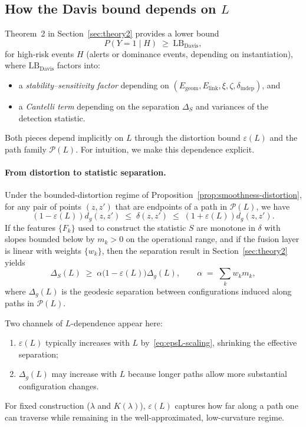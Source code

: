 \documentclass[11pt]{article}
\begin{document}
\subsection{How the Davis bound depends on $L$}
\label{subsec:path-L-dependence}

Theorem~2 in Section~\ref{sec:theory2} provides a lower bound
\[
P(Y = 1 \mid H) \;\ge\; \mathrm{LB}_{\text{Davis}},
\]
for high-risk events $H$ (alerts or dominance events, depending on instantiation), where
$\mathrm{LB}_{\text{Davis}}$ factors into:
\begin{itemize}[leftmargin=*]
  \item a \emph{stability--sensitivity factor} depending on $(E_{\mathrm{geom}}, E_{\mathrm{link}}, \xi, \zeta, \delta_{\mathrm{indep}})$, and
  \item a \emph{Cantelli term} depending on the separation $\Delta_S$ and variances of the detection statistic.
\end{itemize}

Both pieces depend implicitly on $L$ through the distortion bound $\varepsilon(L)$ and the path
family $\mathcal{P}(L)$. For intuition, we make this dependence explicit.

\paragraph{From distortion to statistic separation.}
Under the bounded-distortion regime of Proposition~\ref{prop:smoothness-distortion}, for any
pair of points $(z,z')$ that are endpoints of a path in $\mathcal{P}(L)$, we have
\[
(1-\varepsilon(L)) d_g(z,z') \;\le\; \delta(z,z') \;\le\; (1+\varepsilon(L)) d_g(z,z').
\]
If the features $\{F_k\}$ used to construct the statistic $S$ are monotone in $\delta$ with slopes
bounded below by $m_k>0$ on the operational range, and if the fusion layer is linear with weights
$\{w_k\}$, then the separation result in Section~\ref{sec:theory2} yields
\begin{equation}
  \label{eq:deltaS-vs-L}
  \Delta_S(L) \;\ge\; \alpha \bigl(1-\varepsilon(L)\bigr) \Delta_g(L),
  \qquad
  \alpha \;=\; \sum_k w_k m_k,
\end{equation}
where $\Delta_g(L)$ is the geodesic separation between configurations induced along paths in
$\mathcal{P}(L)$.

Two channels of $L$-dependence appear here:
\begin{enumerate}[label=(\alph*), leftmargin=*]
  \item $\varepsilon(L)$ typically increases with $L$ by~\eqref{eq:epsL-scaling}, shrinking the effective separation;
  \item $\Delta_g(L)$ may increase with $L$ because longer paths allow more substantial configuration changes.
\end{enumerate}
For fixed construction ($\lambda$ and $K(\lambda)$), $\varepsilon(L)$ captures how far along a path one
can traverse while remaining in the well-approximated, low-curvature regime.
\end{document}
